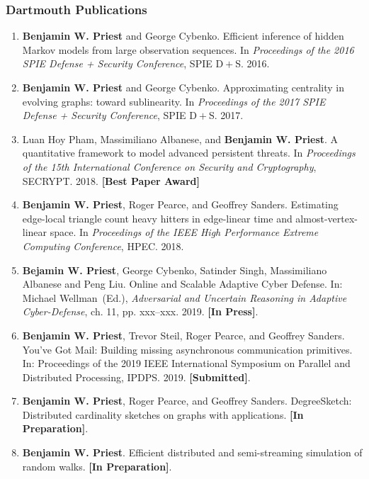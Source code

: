 \documentclass{beamer}
\begin{document}
\begin{frame}
\frametitle{Dartmouth Publications}

{\scriptsize
\begin{enumerate}
\item \textbf{Benjamin W. Priest} and George Cybenko.
	Efficient inference of hidden Markov models from large observation sequences.
	In \emph{Proceedings of the 2016 SPIE Defense + Security Conference}, 
	SPIE D$\! + \!$S.
	2016.

\item \textbf{Benjamin W. Priest} and George Cybenko.
	Approximating centrality in evolving graphs: toward sublinearity.
	In \emph{Proceedings of the 2017 SPIE Defense + Security Conference}, 
	SPIE D$\! + \!$S.
	2017.

\item Luan Hoy Pham, Massimiliano Albanese, and \textbf{Benjamin W. Priest}.
	A quantitative framework to model advanced persistent threats.
	In \emph{Proceedings of the 15th International Conference on Security and Cryptography}, 
	SECRYPT. 
	2018.
	\textbf{[Best Paper Award]}
	
\item \textbf{Benjamin W. Priest}, Roger Pearce, and Geoffrey Sanders.
	Estimating edge-local triangle count heavy hitters in edge-linear time and almost-vertex-linear space.
	In \emph{Proceedings of the IEEE High Performance Extreme Computing Conference}, 
	HPEC. 
	2018.
	
\item \textbf{Bejamin W. Priest}, George Cybenko, Satinder Singh, Massimiliano Albanese and Peng Liu.
	Online and Scalable Adaptive Cyber Defense. 
	In:
	Michael Wellman~(Ed.), \emph{Adversarial and Uncertain Reasoning in Adaptive Cyber-Defense}, ch.
	11, pp. xxx--xxx. 2019.
	\textbf{[In Press]}.

\item \textbf{Benjamin W. Priest}, Trevor Steil, Roger Pearce, and Geoffrey Sanders.
	You've {G}ot {M}ail: Building missing asynchronous communication primitives.
	In:
	Proceedings of the 2019 IEEE International Symposium on Parallel and Distributed Processing,
	IPDPS.
	2019.
	\textbf{[Submitted]}.
	
\item \textbf{Benjamin W. Priest}, Roger Pearce, and Geoffrey Sanders.
	DegreeSketch: Distributed cardinality sketches on graphs with applications.
	\textbf{[In Preparation]}.

\item \textbf{Benjamin W. Priest}.
	Efficient distributed and semi-streaming simulation of random walks.
	\textbf{[In Preparation]}.
\end{enumerate}
}

\end{frame}
\end{document}
